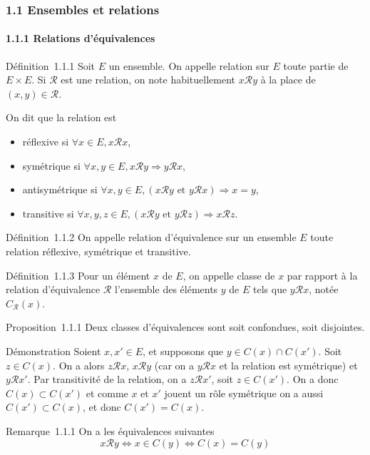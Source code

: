 \subsubsection{1.1 Ensembles et relations}

\paragraph{1.1.1 Relations d'équivalences}

Définition~1.1.1 Soit $E$ un ensemble. On appelle relation sur $E$ toute
partie de $E \times E$. Si $\mathcal{R}$ est une relation, on note habituellement $x\mathcal{R}y$ à la
place de $(x,y) \in\mathcal{R}$.

On dit que la relation est

\begin{itemize}
\itemsep1pt\parskip0pt
\item
  réflexive si $\forall x \in E, x\mathcal{R}x$,
\item
  symétrique si $\forall x,y \in E, x\mathcal{R}y \Rightarrow y\mathcal{R}x$,
\item
  antisymétrique si $\forall x,y \in E, (x\mathcal{R}y\text{ et } y\mathcal{R}x) \Rightarrow x = y$,
\item
  transitive si $\forall x,y,z \in E, (x\mathcal{R}y\text{ et } y\mathcal{R}z) \Rightarrow x\mathcal{R}z$.
\end{itemize}

Définition~1.1.2 On appelle relation d'équivalence sur un ensemble $E$
toute relation réflexive, symétrique et transitive.

Définition~1.1.3 Pour un élément $x$ de $E$, on appelle classe de $x$ par
rapport à la relation d'équivalence $\mathcal{R}$ l'ensemble des éléments $y$ de $E$
tels que $y\mathcal{R}x$, notée $C_{\mathcal{R}}(x)$.

Proposition~1.1.1 Deux classes d'équivalences sont soit confondues, soit
disjointes.

Démonstration Soient $x,x' \in E$, et supposons que $y \in C(x) \cap C(x')$. Soit $z \in C(x)$. On a alors $z\mathcal{R}x$, $x\mathcal{R}y$ (car on a $y\mathcal{R}x$ et la relation est symétrique)
et $y\mathcal{R}x'$. Par transitivité de la relation, on a $z\mathcal{R}x'$, soit $z \in C(x')$. On a
donc $C(x) \subset C(x')$ et comme $x$ et $x'$ jouent un rôle symétrique on a aussi
$C(x') \subset C(x)$, et donc $C(x') = C(x)$.

Remarque~1.1.1 On a les équivalences suivantes
\[
x \mathcal{R} y \Leftrightarrow x \in C(y) \Leftrightarrow C(x) = C(y)
\]

